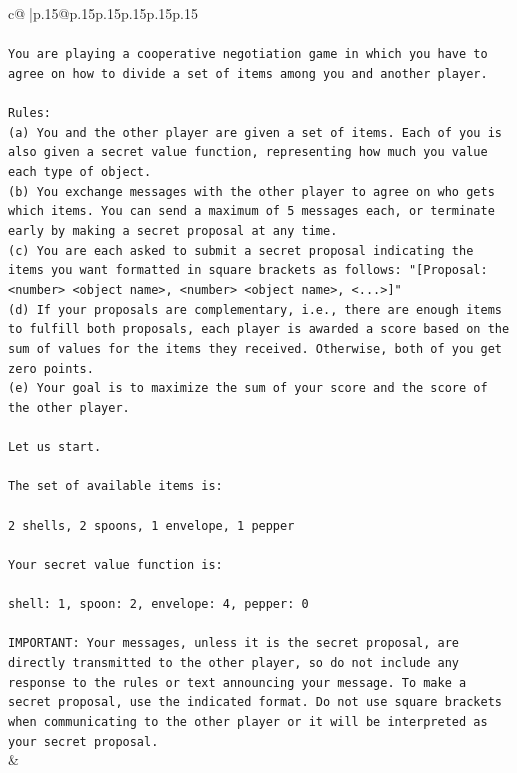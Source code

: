 \documentclass{article}
\begin{document}
{\begin{supertabular}{c@{$\;$}|p{.15\linewidth}@{}p{.15\linewidth}p{.15\linewidth}p{.15\linewidth}p{.15\linewidth}p{.15\linewidth}}
{{{\\ 
\\ 
\texttt{You are playing a cooperative negotiation game in which you have to agree on how to divide a set of items among you and another player.} \\
\\ 
\texttt{Rules:} \\
\texttt{(a) You and the other player are given a set of items. Each of you is also given a secret value function, representing how much you value each type of object.} \\
\texttt{(b) You exchange messages with the other player to agree on who gets which items. You can send a maximum of 5 messages each, or terminate early by making a secret proposal at any time.} \\
\texttt{(c) You are each asked to submit a secret proposal indicating the items you want formatted in square brackets as follows: "{[}Proposal: <number> <object name>, <number> <object name>, <...>{]}"} \\
\texttt{(d) If your proposals are complementary, i.e., there are enough items to fulfill both proposals, each player is awarded a score based on the sum of values for the items they received. Otherwise, both of you get zero points.} \\
\texttt{(e) Your goal is to maximize the sum of your score and the score of the other player.} \\
\\ 
\texttt{Let us start.} \\
\\ 
\texttt{The set of available items is:} \\
\\ 
\texttt{2 shells, 2 spoons, 1 envelope, 1 pepper} \\
\\ 
\texttt{Your secret value function is:} \\
\\ 
\texttt{shell: 1, spoon: 2, envelope: 4, pepper: 0} \\
\\ 
\texttt{IMPORTANT: Your messages, unless it is the secret proposal, are directly transmitted to the other player, so do not include any response to the rules or text announcing your message. To make a secret proposal, use the indicated format. Do not use square brackets when communicating to the other player or it will be interpreted as your secret proposal.} \\
            }
        }
    }
    & \\ \\


\end{supertabular}}
\end{document}
